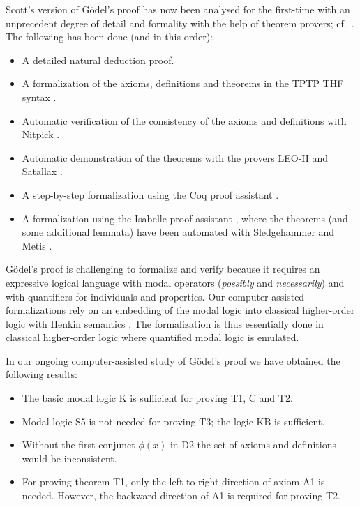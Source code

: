 \documentclass{llncs}
\begin{document}
\noindent
Scott's version of G\"{o}del's proof has now been 
analysed for the first-time
with an unprecedent degree of detail 
and formality with the help of theorem provers; cf.~\cite{FormalTheologyRepository,ComputationalPhilosophyRepository}. 
The following has been done (and in this order):
\begin{itemize}
\item A detailed natural deduction proof.
%
\item A formalization of the axioms, definitions and theorems in the TPTP THF syntax \cite{J22}.
%
\item Automatic verification of the consistency of the axioms and 
definitions with Nitpick \cite{Nitpick}.
%
\item Automatic demonstration of the theorems with the provers LEO-II \cite{LEO-II} and Satallax \cite{Satallax}.

\item A step-by-step formalization using the Coq proof assistant \cite{Coq}.

\item A formalization using the Isabelle proof assistant \cite{Isabelle}, where the theorems (and some additional lemmata) have been automated with Sledgehammer \cite{Sledgehammer} and Metis \cite{Hurd03first-orderproof}.
\end{itemize}

G\"{o}del's proof is challenging to formalize and verify because it
requires an expressive logical language with modal operators
(\emph{possibly} and \emph{necessarily}) and with
quantifiers for individuals and properties.  Our computer-assisted formalizations rely on an
embedding of the modal logic into classical higher-order logic with
Henkin semantics \cite{J23,B9}. The formalization is thus essentially
done in classical higher-order logic where  quantified modal logic is
emulated.

In our ongoing computer-assisted study of G\"odel's proof we have
obtained the following results:
\begin{itemize}
\item The basic modal logic K is sufficient for proving T1, C and T2. 
\item Modal logic S5 is not needed for proving T3; the logic KB is
  sufficient. 
\item Without the first conjunct $\phi(x)$ in D2 the set of axioms 
  and definitions would be inconsistent.
\item For proving theorem T1, only the left to right direction of
  axiom A1 is needed. However, the backward direction of A1 is
  required for proving T2.

\end{itemize}
\end{document}
